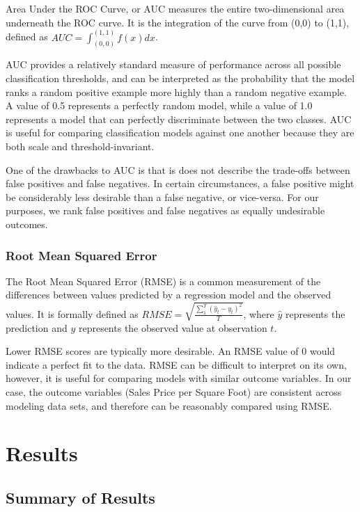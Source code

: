 \documentclass[12pt,]{article}
\begin{document}
Area Under the ROC Curve, or AUC measures the entire two-dimensional
area underneath the ROC curve. It is the integration of the curve from
(0,0) to (1,1), defined as \(AUC = \int_{(0,0)}^{(1,1)} f(x)dx\).

AUC provides a relatively standard measure of performance across all
possible classification thresholds, and can be interpreted as the
probability that the model ranks a random positive example more highly
than a random negative example. A value of 0.5 represents a perfectly
random model, while a value of 1.0 represents a model that can perfectly
discriminate between the two classes. AUC is useful for comparing
classification models against one another because they are both scale
and threshold-invariant.

One of the drawbacks to AUC is that is does not describe the trade-offs
between false positives and false negatives. In certain circumstances, a
false positive might be considerably less desirable than a false
negative, or vice-versa. For our purposes, we rank false positives and
false negatives as equally undesirable outcomes.

\hypertarget{root-mean-squared-error}{%
\subsubsection{Root Mean Squared Error}\label{root-mean-squared-error}}

The Root Mean Squared Error (RMSE) is a common measurement of the
differences between values predicted by a regression model and the
observed values. It is formally defined as
\(RMSE = \sqrt{ \frac{\sum_{1}^{T} (\hat{y}_t - y_t)^2}{T} }\), where
\(\hat{y}\) represents the prediction and \(y\) represents the observed
value at observation \(t\).

Lower RMSE scores are typically more desirable. An RMSE value of 0 would
indicate a perfect fit to the data. RMSE can be difficult to interpret
on its own, however, it is useful for comparing models with similar
outcome variables. In our case, the outcome variables (Sales Price per
Square Foot) are consistent across modeling data sets, and therefore can
be reasonably compared using RMSE.

\hypertarget{results}{%
\section{Results}\label{results}}

\hypertarget{summary-of-results}{%
\subsection{Summary of Results}\label{summary-of-results}}
\end{document}
